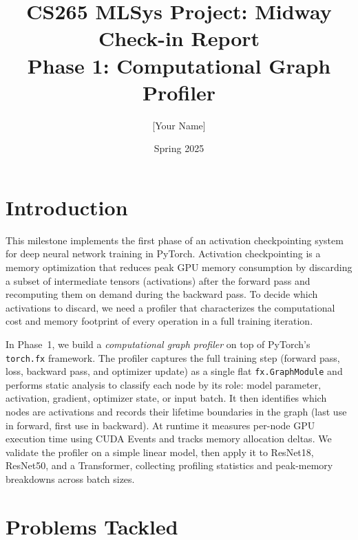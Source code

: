 \documentclass[11pt]{article}
\title{\textbf{CS265 MLSys Project: Midway Check-in Report}\\
       \large Phase 1: Computational Graph Profiler}
\author{[Your Name]}
\date{Spring 2025}
\begin{document}
\maketitle

\section{Introduction}

This milestone implements the first phase of an activation checkpointing
system for deep neural network training in PyTorch.
Activation checkpointing is a memory optimization that reduces peak GPU
memory consumption by discarding a subset of intermediate tensors
(activations) after the forward pass and recomputing them on demand
during the backward pass.
To decide which activations to discard, we need a profiler that
characterizes the computational cost and memory footprint of every
operation in a full training iteration.

In Phase~1, we build a \emph{computational graph profiler} on top of
PyTorch's \texttt{torch.fx} framework.
The profiler captures the full training step (forward pass, loss,
backward pass, and optimizer update) as a single flat
\texttt{fx.GraphModule} and performs static analysis to classify each
node by its role: model parameter, activation, gradient, optimizer
state, or input batch.
It then identifies which nodes are activations and records their
lifetime boundaries in the graph (last use in forward, first use in
backward).
At runtime it measures per-node GPU execution time using CUDA Events
and tracks memory allocation deltas.
We validate the profiler on a simple linear model, then apply it to
ResNet18, ResNet50, and a Transformer, collecting profiling statistics
and peak-memory breakdowns across batch sizes.

\section{Problems Tackled}
\end{document}
